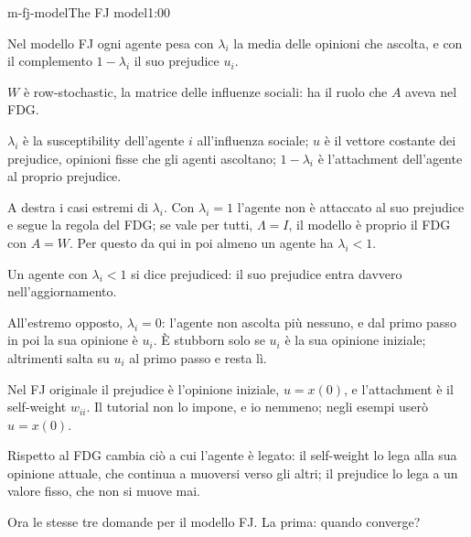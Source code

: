 
\begin{slide}{m-fj-model}{The FJ model}{1:00}
  \begin{discorso}
    \item Nel modello FJ ogni agente pesa con $\lambda_i$ la media delle opinioni che ascolta, e con il complemento $1-\lambda_i$ il suo prejudice $u_i$.
    \item $W$ è row-stochastic, la matrice delle influenze sociali: ha il ruolo che $A$ aveva nel FDG.
    \item $\lambda_i$ è la susceptibility dell'agente $i$ all'influenza sociale; $u$ è il vettore costante dei prejudice, opinioni fisse che gli agenti ascoltano; $1-\lambda_i$ è l'attachment dell'agente al proprio prejudice.
    \item A destra i casi estremi di $\lambda_i$. Con $\lambda_i=1$ l'agente non è attaccato al suo prejudice e segue la regola del FDG; se vale per tutti, $\Lambda=I$, il modello è proprio il FDG con $A=W$. Per questo da qui in poi almeno un agente ha $\lambda_i<1$.
    \item Un agente con $\lambda_i<1$ si dice prejudiced: il suo prejudice entra davvero nell'aggiornamento.
    \item All'estremo opposto, $\lambda_i=0$: l'agente non ascolta più nessuno, e dal primo passo in poi la sua opinione è $u_i$. È stubborn solo se $u_i$ è la sua opinione iniziale; altrimenti salta su $u_i$ al primo passo e resta lì.
    \item Nel FJ originale il prejudice è l'opinione iniziale, $u=x(0)$, e l'attachment è il self-weight $w_{ii}$. Il tutorial non lo impone, e io nemmeno; negli esempi userò $u=x(0)$.
    \item Rispetto al FDG cambia ciò a cui l'agente è legato: il self-weight lo lega alla sua opinione attuale, che continua a muoversi verso gli altri; il prejudice lo lega a un valore fisso, che non si muove mai.
    \item Ora le stesse tre domande per il modello FJ. La prima: quando converge?
  \end{discorso}
\end{slide}

